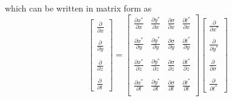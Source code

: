 \documentclass[oribibl]{llncs}
\begin{document}
which can be written in matrix form as
\begin{equation}      
\left[                 
  \begin{array}{c}  
    \frac{\partial}{\partial x}  \\  \nonumber \\ 
    \frac{\partial}{\partial y}  \\ \nonumber \\ 
    \frac{\partial}{\partial z}  \\ \nonumber \\ 
    \frac{\partial}{\partial t} 
  \end{array}
\right]
=  
\left[             
  \begin{array}{cccc}  
    \frac{\partial x^*}{\partial x} & \frac{\partial y^*}{\partial x} & \frac{\partial \sigma}{\partial x} & \frac{\partial t^*}{\partial x}\\   \nonumber \\ 
    \frac{\partial x^*}{\partial y} & \frac{\partial y^*}{\partial y} & \frac{\partial \sigma}{\partial y} & \frac{\partial t^*}{\partial y}\\   \nonumber \\ 
    \frac{\partial x^*}{\partial z} & \frac{\partial y^*}{\partial z} & \frac{\partial \sigma}{\partial z} & \frac{\partial t^*}{\partial z}\\   \nonumber \\ 
    \frac{\partial x^*}{\partial t} & \frac{\partial y^*}{\partial t} & \frac{\partial \sigma}{\partial t} & \frac{\partial t^*}{\partial t}\\  
  \end{array}
\right]              
\left[                 
  \begin{array}{c}  
    \frac{\partial}{\partial x^*}  \\ \\
    \frac{\partial}{\partial y^*}  \\ \\
    \frac{\partial}{\partial \sigma}  \\ \\
    \frac{\partial}{\partial t^*} 
  \end{array}
\right]
\end{equation}
\end{document}
